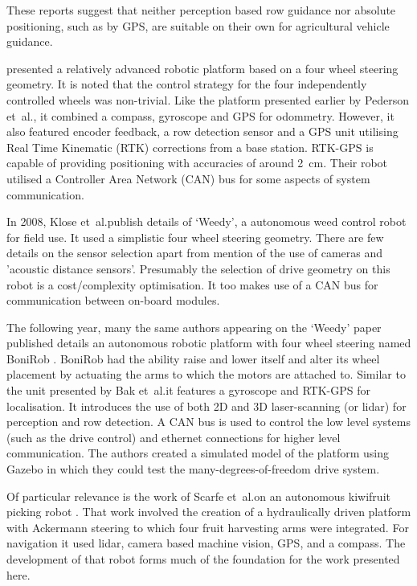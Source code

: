 \documentclass[preprint,authoryear,12pt]{elsarticle}
\begin{document}
    These reports suggest that neither perception based row guidance nor absolute positioning, such as by GPS, are suitable on their own for agricultural vehicle guidance.
    
    \cite{Bak2004} presented a relatively advanced robotic platform based on a four wheel steering geometry.
    It is noted that the control strategy for the four independently controlled wheels was non-trivial.
    Like the platform presented earlier by Pederson et~al.\@, it combined a compass, gyroscope and GPS for odommetry.
    However, it also featured encoder feedback, a row detection sensor and a GPS unit utilising Real Time Kinematic (RTK) corrections from a base station.
    RTK-GPS is capable of providing positioning with accuracies of around \SI{2}{\centi\meter}.
    Their robot utilised a Controller Area Network (CAN) bus for some aspects of system communication.

    In 2008, Klose et~al.\@ publish details of `Weedy', a autonomous weed control robot for field use.
    It used a simplistic four wheel steering geometry.
    There are few details on the sensor selection apart from mention of the use of cameras and 'acoustic distance sensors'.
    Presumably the selection of drive geometry on this robot is a cost/complexity optimisation.
    It too makes use of a CAN bus for communication between on-board modules.

    The following year, many the same authors appearing on the `Weedy' paper published details an autonomous robotic platform with four wheel steering named BoniRob \citep{Ruckelshausen2009}.
    BoniRob had the ability raise and lower itself and alter its wheel placement by actuating the arms to which the motors are attached to.
    Similar to the unit presented by Bak et~al.\@ it features a gyroscope and RTK-GPS for localisation.
    It introduces the use of both 2D and 3D laser-scanning (or lidar) for perception and row detection.
    A CAN bus is used to control the low level systems (such as the drive control) and ethernet connections for higher level communication.
    The authors created a simulated model of the platform using Gazebo in which they could test the many-degrees-of-freedom drive system.

    Of particular relevance is the work of Scarfe et~al.\@ on an autonomous kiwifruit picking robot \citep{scarfe2009, Scarfe2012}.
    That work involved the creation of a hydraulically driven platform with Ackermann steering to which four fruit harvesting arms were integrated.
    For navigation it used lidar, camera based machine vision, GPS, and a compass.
    The development of that robot forms much of the foundation for the work presented here.
\end{document}
